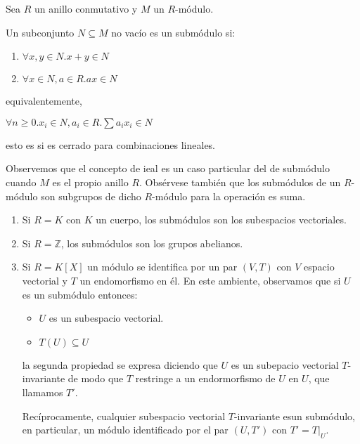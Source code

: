 \begin{definition}[Submódulo]
Sea $R$ un anillo conmutativo y $M$ un $R$-módulo. 

Un subconjunto $N \subseteq M$ no vacío es un submódulo si:

\begin{enumerate}
\item $\forall x,y \in N. x+y \in N$
\item $\forall x \in N,a \in R. ax \in N$
\end{enumerate}

equivalentemente,

$\forall n \ge 0.x_i \in N,a_i \in R.\sum a_ix_i \in N$

esto es si es cerrado para combinaciones lineales. 
\end{definition}

Observemos que el concepto de ieal es un caso particular del de submódulo cuando $M$ es el propio anillo $R$. Obsérvese también que los submódulos de un $R$-módulo son subgrupos de dicho $R$-módulo para la operación es suma. 

\begin{example}
\begin{enumerate}
\item Si $R = K$ con $K$ un cuerpo, los submódulos son los subespacios vectoriales. 

\item Si $R = \mathbb{Z}$, los submódulos son los grupos abelianos. 

\item Si $R = K[X]$ un módulo se identifica por un par $(V,T)$ con $V$ espacio vectorial y $T$ un endomorfismo en él. En este ambiente, observamos que si $U$ es un submódulo entonces:

\begin{itemize}
\item $U$ es un subespacio vectorial.
\item $T(U) \subseteq U$
\end{itemize}

la segunda propiedad se expresa diciendo que $U$ es un subepacio vectorial $T$-invariante de modo que $T$ restringe a un endormorfismo de $U$ en $U$, que llamamos $T'$. 

Recíprocamente, cualquier subespacio vectorial $T$-invariante esun submódulo, en particular, un módulo identificado por el par $(U,T')$ con $T' = T|_U$. 
\end{enumerate}
\end{example}

